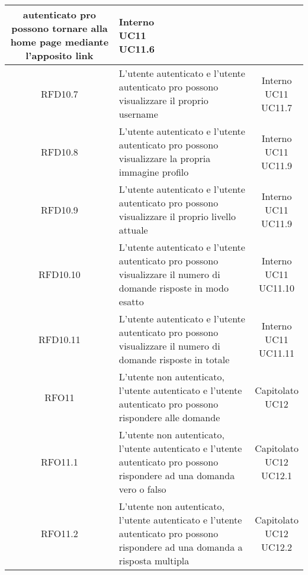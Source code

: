 \begin{longtable}{|c|>{\centering}m{7cm}|c|}
autenticato pro possono tornare alla
home page mediante l’apposito link & \makecell{Interno\\ UC11 \\UC11.6 } \\ \hline
			 \hypertarget{{RFD10.7}}{{RFD10.7}} & L’utente autenticato e l’utente
autenticato pro possono visualizzare il proprio username & \makecell{Interno\\ UC11 \\UC11.7 } \\ \hline
			 \hypertarget{{RFD10.8}}{{RFD10.8}} & L’utente autenticato e l’utente
autenticato pro possono visualizzare la propria immagine profilo & \makecell{Interno\\ UC11 \\UC11.9 } \\ \hline
			 \hypertarget{{RFD10.9}}{{RFD10.9}} & L’utente autenticato e l’utente
autenticato pro possono visualizzare il proprio livello attuale & \makecell{Interno\\ UC11 \\UC11.9 } \\ \hline
			 \hypertarget{{RFD10.10}}{{RFD10.10}} & L’utente autenticato e l’utente
autenticato pro possono visualizzare il numero di domande risposte in
modo esatto & \makecell{Interno\\ UC11 \\UC11.10 } \\ \hline
			 \hypertarget{{RFD10.11}}{{RFD10.11}} & L’utente autenticato e l’utente autenticato pro possono visualizzare il numero di domande risposte in totale & \makecell{Interno\\ UC11 \\UC11.11 } \\ \hline
			 \hypertarget{{RFO11}}{{RFO11}} & L’utente non autenticato, l’utente
autenticato e l’utente autenticato pro
possono rispondere alle domande & \makecell{Capitolato\\ UC12 } \\ \hline
			 \hypertarget{{RFO11.1}}{{RFO11.1}} & L’utente non autenticato, l’utente
autenticato e l’utente autenticato pro
possono rispondere ad una domanda vero
o falso & \makecell{Capitolato\\ UC12 \\UC12.1 } \\ \hline
			 \hypertarget{{RFO11.2}}{{RFO11.2}} & L’utente non autenticato, l’utente
autenticato e l’utente autenticato pro
possono rispondere ad una domanda a
risposta multipla & \makecell{Capitolato\\ UC12 \\UC12.2 } \\ \hline

\end{longtable}
